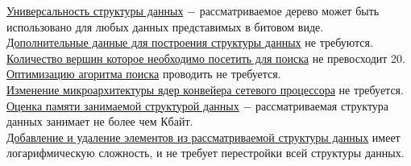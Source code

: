 \documentclass[a4peper, 12pt, titlepage, finall]{report}
\begin{document}
            \underline{Универсальность структуры данных} $-$ рассматриваемое дерево может быть использовано для любых данных представимых в битовом виде.\\
            \underline{Дополнительные данные для построения структуры данных} не требуются.\\
            \underline{Количество вершин которое необходимо посетить для поиска} не превосходит 20.\\
            \underline{Оптимизацию агоритма поиска} проводить не требуется.\\
            \underline{Изменение микроархитектуры ядер конвейера сетевого процессора} не требуется.\\
            \underline{Оценка памяти занимаемой структурой данных} $-$ рассматриваемая структура данных занимает не более чем Кбайт.\\
            \underline{Добавление и удаление элементов из рассматриваемой структуры данных} имеет логарифмическую сложность, и не требует перестройки всей структуры данных.\\
\end{document}
